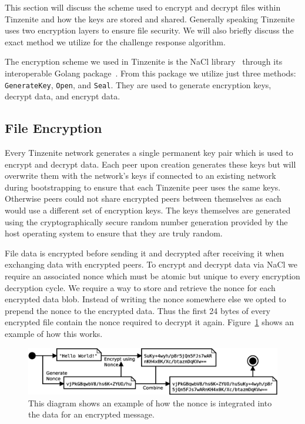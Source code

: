 This section will discuss the scheme used to encrypt and decrypt files within Tinzenite and how the keys are stored and shared.
Generally speaking Tinzenite uses two encryption layers to ensure file security.
We will also briefly discuss the exact method we utilize for the challenge response algorithm.

The encryption scheme we used in Tinzenite is the NaCl library~\cite{bernstein2012security} through its interoperable Golang package~\cite{web:site:golang:box}.%
From this package we utilize just three methods: \texttt{GenerateKey}, \texttt{Open}, and \texttt{Seal}.
They are used to generate encryption keys, decrypt data, and encrypt data.

\subsection{File Encryption}
\label{sub:File Encryption}

Every Tinzenite network generates a single permanent key pair which is used to encrypt and decrypt data.
Each peer upon creation generates these keys but will overwrite them with the network's keys if connected to an existing network during bootstrapping to ensure that each Tinzenite peer uses the same keys.
Otherwise peers could not share encrypted peers between themselves as each would use a different set of encryption keys.
The keys themselves are generated using the cryptographically secure random number generation provided by the host operating system to ensure that they are truly random.

File data is encrypted before sending it and decrypted after receiving it when exchanging data with encrypted peers.
To encrypt and decrypt data via NaCl we require an associated nonce which must be atomic but unique to every encryption decryption cycle.
We require a way to store and retrieve the nonce for each encrypted data blob.
Instead of writing the nonce somewhere else we opted to prepend the nonce to the encrypted data. %
Thus the first 24 bytes of every encrypted file contain the nonce required to decrypt it again.
Figure~\ref{fig:enc_algo} shows an example of how this works.

\begin{figure}[htp]
\centering
    \includegraphics[width=14cm]{diagram/enc_algo}
\caption[Encryption Example]{This diagram shows an example of how the nonce is integrated into the data for an encrypted message.}
\label{fig:enc_algo}
\end{figure}


